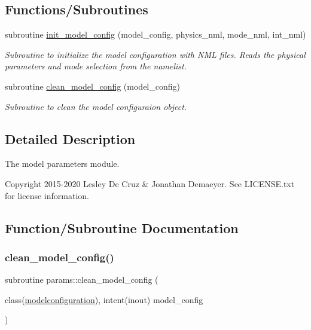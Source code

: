 \subsection*{Functions/\+Subroutines}
\begin{DoxyCompactItemize}
\item 
subroutine \hyperlink{namespaceparams_a31ec8602a62124ae49da2b78a35979c0}{init\+\_\+model\+\_\+config} (model\+\_\+config, physics\+\_\+nml, mode\+\_\+nml, int\+\_\+nml)
\begin{DoxyCompactList}\small\item\em Subroutine to initialize the model configuration with N\+ML files. Reads the physical parameters and mode selection from the namelist. \end{DoxyCompactList}\item 
subroutine \hyperlink{namespaceparams_a3be9369b0e60550ec4797e18fa116454}{clean\+\_\+model\+\_\+config} (model\+\_\+config)
\begin{DoxyCompactList}\small\item\em Subroutine to clean the model configuraion object. \end{DoxyCompactList}\end{DoxyCompactItemize}


\subsection{Detailed Description}
The model parameters module. 

\begin{DoxyCopyright}{Copyright}
2015-\/2020 Lesley De Cruz \& Jonathan Demaeyer. See L\+I\+C\+E\+N\+S\+E.\+txt for license information. 
\end{DoxyCopyright}


\subsection{Function/\+Subroutine Documentation}
\mbox{\label{namespaceparams_a3be9369b0e60550ec4797e18fa116454}} 
\subsubsection{\texorpdfstring{clean\+\_\+model\+\_\+config()}{clean\_model\_config()}}
{\footnotesize\ttfamily subroutine params\+::clean\+\_\+model\+\_\+config (\begin{DoxyParamCaption}\item[{class(\hyperlink{structparams_1_1modelconfiguration}{modelconfiguration}), intent(inout)}]{model\+\_\+config }\end{DoxyParamCaption})}



